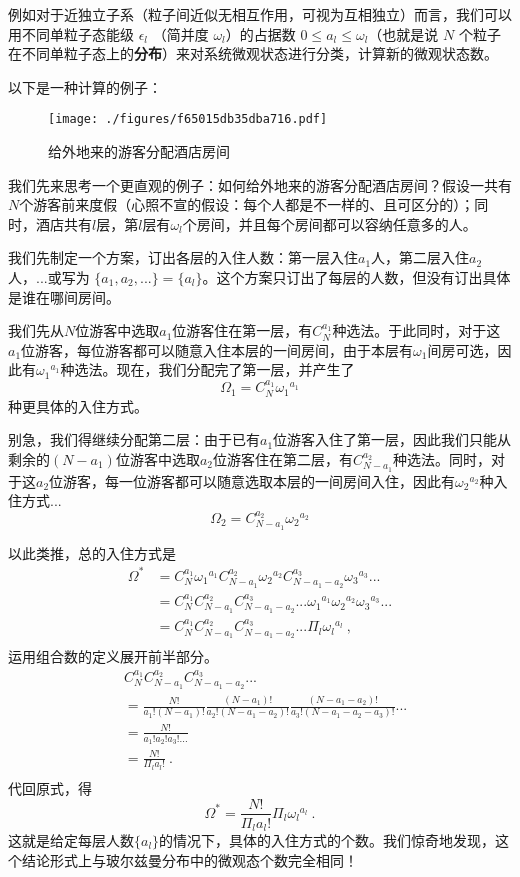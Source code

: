 例如对于近独立子系（粒子间近似无相互作用，可视为互相独立）而言，我们可以用不同单粒子态能级 $\epsilon_l$ （简并度 $\omega_l$）的占据数 $0\le a_l\le \omega_l$（也就是说 $N$ 个粒子在不同单粒子态上的\textbf{分布}）来对系统微观状态进行分类，计算新的微观状态数。

以下是一种计算的例子：
\begin{example}{}
\begin{figure}[ht]
\centering
\texttt{[image: ./figures/f65015db35dba716.pdf]}
\caption{给外地来的游客分配酒店房间} \label{fig_entro2_1}
\end{figure}
我们先来思考一个更直观的例子：如何给外地来的游客分配酒店房间？假设一共有$N$个游客前来度假（心照不宣的假设：每个人都是不一样的、且可区分的）；同时，酒店共有$l$层，第$l$层有$\omega_l$个房间，并且每个房间都可以容纳任意多的人。

我们先制定一个方案，订出各层的入住人数：第一层入住$a_1$人，第二层入住$a_2$人，...或写为 $\{a_1,a_2,...\}=\{a_l\}$。这个方案只订出了每层的人数，但没有订出具体是谁在哪间房间。

我们先从$N$位游客中选取$a_1$位游客住在第一层，有$C_N^{a_1}$种选法。于此同时，对于这$a_1$位游客，每位游客都可以随意入住本层的一间房间，由于本层有$\omega_1$间房可选，因此有${\omega_1}^{a_1}$种选法。现在，我们分配完了第一层，并产生了$$\Omega_1 = C_N^{a_1} {\omega_1}^{a_1}$$种更具体的入住方式。

别急，我们得继续分配第二层：由于已有$a_1$位游客入住了第一层，因此我们只能从剩余的$(N-a_1)$位游客中选取$a_2$位游客住在第二层，有$C_{N-a_1}^{a_2}$种选法。同时，对于这$a_2$位游客，每一位游客都可以随意选取本层的一间房间入住，因此有${\omega_2}^{a_2}$种入住方式...
$$\Omega_2 = C_{N-a_1}^{a_2} {\omega_2}^{a_2}$$

以此类推，总的入住方式是
$$
\begin{aligned}
\Omega^* &= C_N^{a_1} {\omega_1}^{a_1} C_{N-a_1}^{a_2} {\omega_2}^{a_2} C_{N-a_1-a_2}^{a_3} {\omega_3}^{a_3}...\\
&=C_N^{a_1} C_{N-a_1}^{a_2} C_{N-a_1-a_2}^{a_3} ... {\omega_1}^{a_1}{\omega_2}^{a_2}  {\omega_3}^{a_3}...\\
& = C_N^{a_1} C_{N-a_1}^{a_2} C_{N-a_1-a_2}^{a_3} ... \Pi_l{\omega_l}^{a_l}~,\\
\end{aligned}
$$
运用组合数的定义展开前半部分。
$$
\begin{aligned}
& C_N^{a_1} C_{N-a_1}^{a_2} C_{N-a_1-a_2}^{a_3} ...\\
&= \frac{N!}{a_1!(N-a_1)!} 
\frac{(N-a_1)!}{a_2!(N-a_1-a_2)!}
\frac{(N-a_1-a_2)!}{a_3!(N-a_1-a_2-a_3)!}
...\\
&=\frac{N!}{a_1!a_2!a_3!...} \\
&=\frac{N!}{\Pi_l a_l!} ~.\\
\end{aligned}
$$
代回原式，得
$$
\Omega^* = \frac{N!}{\Pi_l a_l!}  \Pi_l{\omega_l}^{a_l}~.
$$
这就是给定每层人数$\{a_l\}$的情况下，具体的入住方式的个数。我们惊奇地发现，这个结论形式上与玻尔兹曼分布中的微观态个数完全相同！


\end{example}
